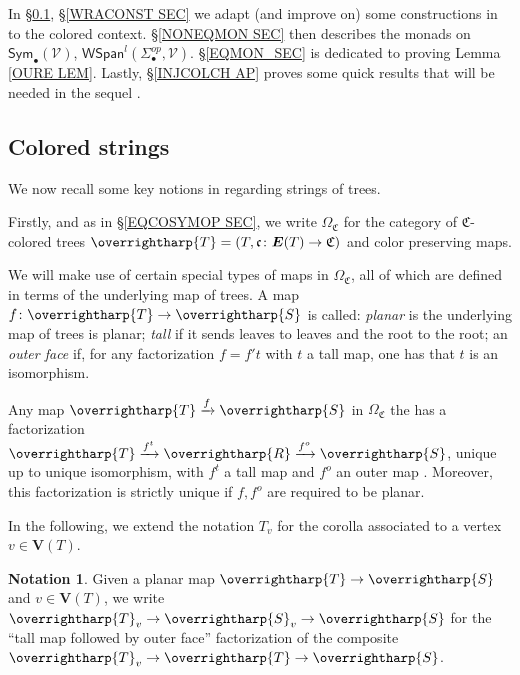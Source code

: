 \documentclass[a4paper,10pt
,draft
]{article}%
\numberwithin{equation}{section}
\numberwithin{figure}{section}
\theoremstyle{definition} %
\newtheorem{notation}[equation]{Notation}%
\newcommand{\vect}[1]{\text{\overrightharp{\ensuremath{#1}}}}
\newcommand{\V}{\ensuremath{\mathcal V}}
\newcommand{\1}{\ensuremath{\mathbbm 1}}%
\begin{document}
In \S \ref{CSTRINGS_SEC}, \S \ref{WRACONST SEC}
we adapt (and improve on) 
some constructions in \cite{BP_geo}
to the colored context.
%
\S \ref{NONEQMON SEC} then describes the monads on
$\mathsf{Sym}_{\bullet}(\V)$, $\mathsf{WSpan}^l(\Sigma_{\bullet}^{op},\mathcal{V})$.
%
\S \ref{EQMON_SEC} is dedicated to proving Lemma \ref{OURE LEM}.
Lastly,
\S \ref{INJCOLCH AP}
proves some quick results that 
will be needed in the sequel \cite{BP_ACOP}.





\subsection{Colored strings}
\label{CSTRINGS_SEC}


We now recall some key notions in \cite{BP_geo}
regarding strings of trees.

Firstly, and as in \S \ref{EQCOSYMOP SEC},
we write 
$\Omega_{\mathfrak{C}}$
for the category of 
$\mathfrak{C}$-colored trees
$\vect{T} = (T,\mathfrak{c}\colon \boldsymbol{E}(T) \to \mathfrak{C})$
and color preserving maps.

We will make use of certain special types of maps in $\Omega_{\mathfrak{C}}$, all of which are defined in terms of the underlying map of trees.
A map $f \colon \vect{T} \to \vect{S}$
is called:
\emph{planar} is the underlying map of trees is planar;
\emph{tall} if it sends leaves to leaves and the root to the root;
an \emph{outer face}
if, for any factorization 
$f = f' t$ with $t$ a tall map, one has that $t$ is an isomorphism. 

Any map $\vect{T} \xrightarrow{f} \vect{S}$ in $\Omega_{\mathfrak{C}}$
the has a factorization
$\vect{T} \xrightarrow{f^t} \vect{R} \xrightarrow{f^o} \vect{S}$,
unique up to unique isomorphism,
with $f^t$ a tall map and $f^o$ an outer map
\cite[Prop. 3.36]{BP_geo}.
Moreover, this factorization is strictly unique if $f,f^o$ are required to be planar.

In the following,
we extend the notation $T_v$ for the corolla associated to a vertex 
$v \in \boldsymbol{V}(T)$.


\begin{notation}\label{SVNOT NOT}
	Given a planar map $\vect{T} \to \vect{S}$
	and $v \in \boldsymbol{V}(T)$,
	we write
	$\vect{T}_v \to \vect{S}_v \to \vect{S}$
	for the ``tall map followed by outer face''
	factorization of the composite
	$\vect{T}_v \to \vect{T} \to \vect{S}$.
\end{notation}
\end{document}
